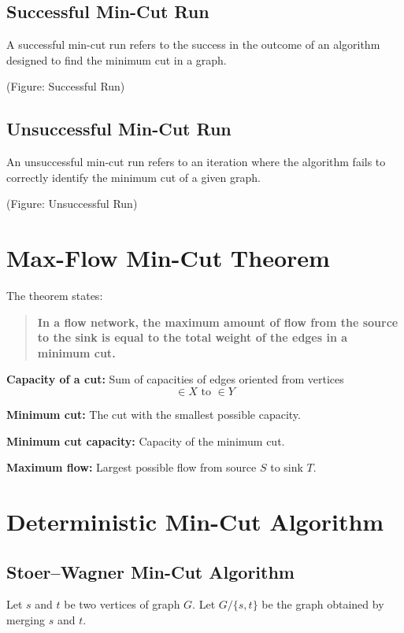 \documentclass[12pt]{article}
\begin{document}
\subsection*{Successful Min-Cut Run}

A successful min-cut run refers to the success in the outcome of an algorithm designed to find the minimum cut in a graph.

(Figure: Successful Run)

\subsection*{Unsuccessful Min-Cut Run}

An unsuccessful min-cut run refers to an iteration where the algorithm fails to correctly identify the minimum cut of a given graph.

(Figure: Unsuccessful Run)

\section*{Max-Flow Min-Cut Theorem}

The theorem states:

\begin{quote}
\textbf{In a flow network, the maximum amount of flow from the source to the sink is equal to the total weight of the edges in a minimum cut.}
\end{quote}

\textbf{Capacity of a cut:}  
Sum of capacities of edges oriented from vertices
\[
\in X \text{ to } \in Y
\]

\textbf{Minimum cut:}  
The cut with the smallest possible capacity.

\textbf{Minimum cut capacity:}  
Capacity of the minimum cut.

\textbf{Maximum flow:}  
Largest possible flow from source \( S \) to sink \( T \).

\section*{Deterministic Min-Cut Algorithm}

\subsection*{Stoer–Wagner Min-Cut Algorithm}

Let \( s \) and \( t \) be two vertices of graph \( G \).  
Let \( G/\{s,t\} \) be the graph obtained by merging \( s \) and \( t \).
\end{document}
